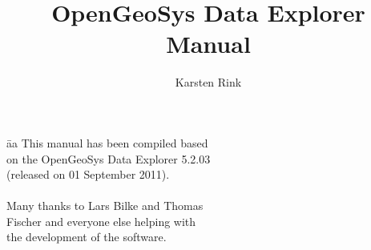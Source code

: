 \documentclass[11pt,twoside,a4paper]{book}
\title{{\LARGE OpenGeoSys Data Explorer}\\[0.5em] Manual}
\author{Karsten Rink}
\newcommand{\ogs}{OpenGeoSys }
\begin{document}
\pagestyle{empty}
\maketitle
\newpage

\vspace*{16cm}
\begin{tabbing}

\hspace*{14cm}\=aa\kill
\noindent This manual has been compiled based \> \\on the \ogs Data Explorer 5.2.03 \> \\(released on 01 September 2011). \> \\
\> \\
\noindent Many thanks to Lars Bilke and Thomas \> \\ Fischer and everyone else helping with \> \\ the development of the software. \> \\
\end{tabbing}

\newpage

\tableofcontents

\cleardoublepage

\pagestyle{fancy}









\appendix


\cleardoublepage
\end{document}
